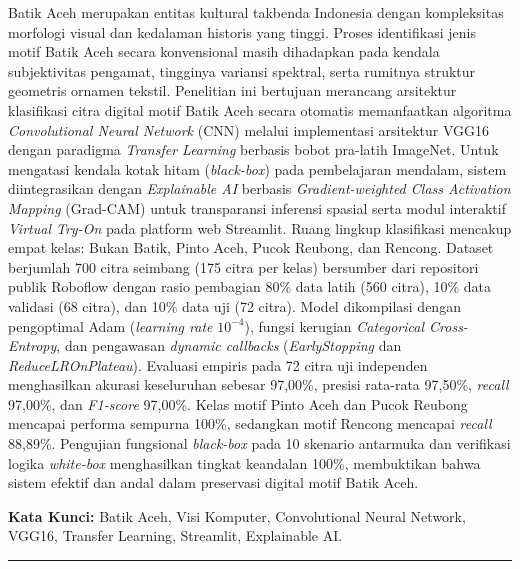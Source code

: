 \documentclass[10pt,a4paper]{article}
\begin{document}
{\fontsize{9.5pt}{12pt}\selectfont
Batik Aceh merupakan entitas kultural takbenda Indonesia dengan kompleksitas morfologi visual dan kedalaman historis yang tinggi. Proses identifikasi jenis motif Batik Aceh secara konvensional masih dihadapkan pada kendala subjektivitas pengamat, tingginya variansi spektral, serta rumitnya struktur geometris ornamen tekstil. Penelitian ini bertujuan merancang arsitektur klasifikasi citra digital motif Batik Aceh secara otomatis memanfaatkan algoritma \textit{Convolutional Neural Network} (CNN) melalui implementasi arsitektur VGG16 dengan paradigma \textit{Transfer Learning} berbasis bobot pra-latih ImageNet. Untuk mengatasi kendala kotak hitam (\textit{black-box}) pada pembelajaran mendalam, sistem diintegrasikan dengan \textit{Explainable AI} berbasis \textit{Gradient-weighted Class Activation Mapping} (Grad-CAM) untuk transparansi inferensi spasial serta modul interaktif \textit{Virtual Try-On} pada platform web Streamlit. Ruang lingkup klasifikasi mencakup empat kelas: Bukan Batik, Pinto Aceh, Pucok Reubong, dan Rencong. Dataset berjumlah 700 citra seimbang (175 citra per kelas) bersumber dari repositori publik Roboflow dengan rasio pembagian 80\% data latih (560 citra), 10\% data validasi (68 citra), dan 10\% data uji (72 citra). Model dikompilasi dengan pengoptimal Adam (\textit{learning rate} $10^{-4}$), fungsi kerugian \textit{Categorical Cross-Entropy}, dan pengawasan \textit{dynamic callbacks} (\textit{EarlyStopping} dan \textit{ReduceLROnPlateau}). Evaluasi empiris pada 72 citra uji independen menghasilkan akurasi keseluruhan sebesar 97,00\%, presisi rata-rata 97,50\%, \textit{recall} 97,00\%, dan \textit{F1-score} 97,00\%. Kelas motif Pinto Aceh dan Pucok Reubong mencapai performa sempurna 100\%, sedangkan motif Rencong mencapai \textit{recall} 88,89\%. Pengujian fungsional \textit{black-box} pada 10 skenario antarmuka dan verifikasi logika \textit{white-box} menghasilkan tingkat keandalan 100\%, membuktikan bahwa sistem efektif dan andal dalam preservasi digital motif Batik Aceh.\par}

\vspace{4pt}
{\fontsize{9.5pt}{12pt}\selectfont\textbf{Kata Kunci:} Batik Aceh, Visi Komputer, Convolutional Neural Network, VGG16, Transfer Learning, Streamlit, Explainable AI.\par}

\vspace{3pt}
\noindent\rule{\textwidth}{0.4pt}
\vspace{4pt}
\end{document}
